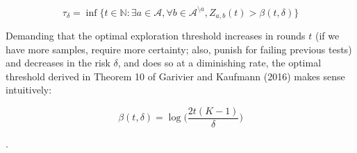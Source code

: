 \documentclass[12pt,]{article}
\begin{document}
\begin{equation*}
\tau_{\delta} = \inf \{t \in \mathbb{N}: \exists a \in \mathcal{A}, \forall b\in \mathcal{A}^{\setminus a}, Z_{a,b}(t) > \beta(t, \delta)\}
\end{equation*}

Demanding that the optimal exploration threshold increases in rounds
\(t\) (if we have more samples, require more certainty; also, punish for
failing previous tests) and decreases in the risk \(\delta\), and does
so at a diminishing rate, the optimal threshold derived in Theorem 10 of
Garivier and Kaufmann (2016) makes sense intuitively:

\begin{equation*}
\beta(t, \delta) = \log \Big(\frac{2t(K-1)}{\delta}\Big)
\end{equation*}

.
\end{document}

